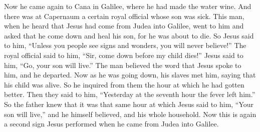 \begin{biblechapter}
 Now he came again to Cana in Galilee, where he had made the water wine. And there was at Capernaum a certain royal official whose son was sick.
\verse This man, when he heard that Jesus had come from Judea into Galilee, went to him and asked that he come down and heal his son, for he was about to die.
\verse So Jesus said to him, “Unless you people see signs and wonders, you will never believe!”
\verse The royal official said to him, “Sir, come down before my child dies!”
\verse Jesus said to him, “Go, your son will live.” The man believed the word that Jesus spoke to him, and he departed.
\verse Now as he was going down, his slaves met him, saying that his child was alive.
\verse So he inquired from them the hour at which he had gotten better. Then they said to him, “Yesterday at the seventh hour the fever left him.”
\verse So the father knew that it was that same hour at which Jesus said to him, “Your son will live,” and he himself believed, and his whole household.
\verse Now this is again a second sign Jesus performed when he came from Judea into Galilee.
\end{biblechapter}

